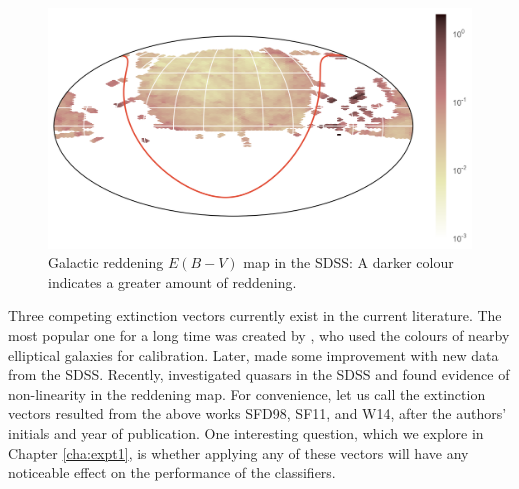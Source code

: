 \begin{figure}[tbp]
	\centering
	\includegraphics[width=\textwidth]{figures/2_astro/ebv_map}
	\caption[Galactic reddening map in the SDSS]{Galactic reddening $E(B-V)$ map in the SDSS:
		A darker colour indicates a greater amount of reddening.}
	\label{fig:reddening}
\end{figure}

Three competing extinction vectors currently exist in the current literature. The most popular one
for a long time was created by , who used the colours of nearby elliptical
galaxies for calibration. Later,  made some improvement with new data from the
SDSS. Recently,  investigated quasars in the SDSS and found evidence of non-linearity
in the reddening map. For convenience, let us call the extinction vectors resulted from the above
works SFD98, SF11, and W14, after the authors' initials and year of publication. One interesting
question, which we explore in Chapter \ref{cha:expt1}, is whether applying any of these vectors
will have any noticeable effect on the performance of the classifiers.



